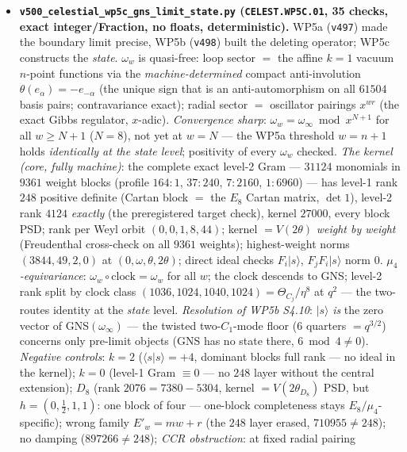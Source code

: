 \begin{itemize}[leftmargin=1.5em]
\item \textbf{\texttt{v500\_celestial\_wp5c\_gns\_limit\_state.py} (\texttt{CELEST.WP5C.01}, 35
checks, exact integer/Fraction, no floats, deterministic).} WP5a (\texttt{v497}) made the boundary
limit precise, WP5b (\texttt{v498}) built the deleting operator; WP5c constructs the \emph{state}.
$\omega_w$ is quasi-free: loop sector $=$ the affine $k{=}1$ vacuum $n$-point functions via the
\emph{machine-determined} compact anti-involution $\theta(e_\alpha)={-}e_{-\alpha}$ (the unique sign
that is an anti-automorphism on all $61504$ basis pairs; contravariance exact); radial sector $=$
oscillator pairings $x^{wr}$ (the exact Gibbs regulator, $x$-adic). \emph{Convergence sharp}:
$\omega_w=\omega_\infty\bmod x^{N+1}$ for all $w\ge N{+}1$ ($N{=}8$), not yet at $w=N$ --- the WP5a
threshold $w=n{+}1$ holds \emph{identically at the state level}; positivity of every $\omega_w$
checked. \emph{The kernel (core, fully machine)}: the complete exact level-2 Gram --- $31124$
monomials in $9361$ weight blocks (profile $164{:}1$, $37{:}240$, $7{:}2160$, $1{:}6960$) --- has
level-1 rank $248$ positive definite (Cartan block $=$ the $E_8$ Cartan matrix, $\det1$), level-2
rank $4124$ \emph{exactly} (the preregistered target check), kernel $27000$, every block PSD; rank
per Weyl orbit $(0,0,1,8,44)$; kernel $=V(2\theta)$ \emph{weight by weight} (Freudenthal cross-check
on all $9361$ weights); highest-weight norms $(3844,49,2,0)$ at $(0,\omega,\theta,2\theta)$; direct
ideal checks $F_i|s\rangle$, $F_jF_i|s\rangle$ norm $0$. \emph{$\mu_4$-equivariance}:
$\omega_w\circ\text{clock}=\omega_w$ for all $w$; the clock descends to GNS; level-2 rank split by
clock class $(1036,1024,1040,1024)=\Theta_{C_j}/\eta^8$ at $q^2$ --- the two-routes identity at the
\emph{state} level. \emph{Resolution of WP5b S4.10}: $|s\rangle$ \emph{is} the zero vector of
GNS$(\omega_\infty)$ --- the twisted two-$C_1$-mode floor ($6$ quarters $=q^{3/2}$) concerns only
pre-limit objects (GNS has no state there, $6\bmod4\neq0$). \emph{Negative controls}: $k{=}2$
($\langle s|s\rangle={+}4$, dominant blocks full rank --- no ideal in the kernel); $k{=}0$ (level-1
Gram $\equiv0$ --- no $248$ layer without the central extension); $D_8$ (rank $2076=7380-5304$,
kernel $=V(2\theta_{D_8})$ PSD, but $h=(0,\tfrac12,1,1)$: one block of four --- one-block
completeness stays $E_8/\mu_4$-specific); wrong family $E'_w=mw{+}r$ (the $248$ layer erased,
$710955\neq248$); no damping ($897266\neq248$); \emph{CCR obstruction}: at fixed radial pairing

\end{itemize}
